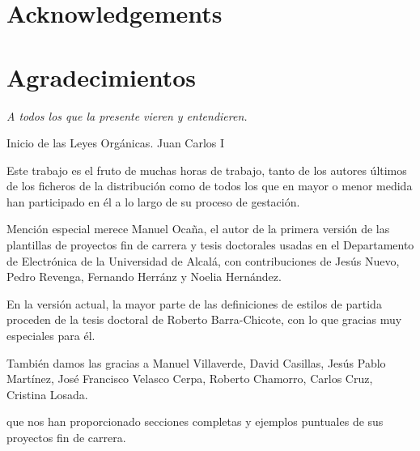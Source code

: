 \documentclass[spanish,openright]{book}
\newenvironment{FraseCelebre}{\begin{list}{}{\setlength{\leftmargin}{0.5\textwidth}\setlength{\parsep}{0cm}\addtolength{\topsep}{0.5cm}}
}
{\unskip \end{list}}
\newenvironment{Frase}{\item \begin{flushright}\small\em}{\end{flushright}}
\newenvironment{Fuente}{\item \begin{flushright}\small}{\end{flushright}}
\newcommand{\myLanguage}{spanish}
\begin{document}
\vspace{4cm}
\vspace*{\fill}







\thispagestyle{empty}

\ifthenelse{\equal{\myLanguage}{english}}
{
\chapter*{Acknowledgements}
\label{cha:acknowledgements}
}
{
\chapter*{Agradecimientos}
\label{cha:agradecimientos}
}




\begin{FraseCelebre}
\begin{Frase}
A todos los que la presente vieren y entendieren.
\end{Frase}
\begin{Fuente}
Inicio de las Leyes Orgánicas. Juan Carlos I
\end{Fuente}
\end{FraseCelebre}




Este trabajo es el fruto de muchas horas de trabajo, tanto de los
autores últimos de los ficheros de la distribución como de todos los que
en mayor o menor medida han participado en él a lo largo de su proceso
de gestación.

Mención especial merece Manuel Ocaña, el autor de la primera versión de
las plantillas de proyectos fin de carrera y tesis doctorales usadas en
el Departamento de Electrónica de la Universidad de Alcalá, con
contribuciones de Jesús Nuevo, Pedro Revenga, Fernando Herránz y Noelia
Hernández.

En la versión actual, la mayor parte de las definiciones de estilos de
partida proceden de la tesis doctoral de Roberto Barra-Chicote, con lo
que gracias muy especiales para él.

También damos las gracias a Manuel Villaverde, David Casillas, Jesús Pablo Martínez, José Francisco Velasco Cerpa, Roberto Chamorro, Carlos Cruz, Cristina Losada.

que nos
han proporcionado secciones completas y ejemplos puntuales de sus
proyectos fin de carrera.
\end{document}
